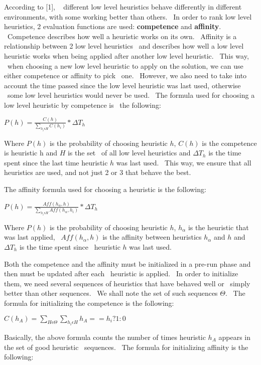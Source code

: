  According to [1], \ %
different low level heuristics behave differently in different environments, with some working better than others. \
In order to rank low level heuristics, 2 evaluation functions are used: \textbf{competence} and \textbf{affinity}. \
Competence describes how well a heuristic works on its own. \
Affinity is a relationship between 2 low level heuristics \
and describes how well a low level heuristic works when being applied after another low level heuristic. \
This way, \
when choosing a new low level heuristic to apply on the solution, we can use either competence or affinity to pick \
one. \
However, we also need to take into account the time passed since the low level heuristic was last used, otherwise \
some low level heuristics would never be used. \
The formula used for choosing a low level heuristic by competence is \
the following:

\( P(h) = \frac{C(h)}{\sum_{h_i \epsilon H} C(h_i)} * \Delta T_h \)

Where $P(h)$ is the probability of choosing heuristic $h$, $C(h)$ is the competence is heuristic h and $H$ is the set \
of all low level heuristics and $\Delta T_h$ is the time spent since the last time heuristic $h$ was last used. \
This way, we ensure that all heuristics are used, and not just 2 or 3 that behave the best.

The affinity formula used for choosing a heuristic is the following:

\( P(h) = \frac{Aff(h_\alpha, h)}{\sum_{h_i \epsilon H} Aff(h_\alpha , h_i)} * \Delta T_h \)

Where $P(h)$ is the probability of choosing heuristic $h$, $h_\alpha$ is the heuristic that was last applied, \
$Aff(h_\alpha , h)$ is the affinity between heuristics $h_\alpha$ and $h$ and $\Delta T_h$ is the time spent since \
heuristic $h$ was last used.

Both the competence and the affinity must be initialized in a pre-run phase and then must be updated after each \
heuristic is applied. \
In order to initialize them, we need several sequences of heuristics that have behaved well or \
simply better than other sequences. \
We shall note the set of such sequences $\Theta$. \
The formula for initializing the competence is the following:

\( C(h_A) = \sum_{H \epsilon \Theta} \sum_{h_i \epsilon H} h_A == h_i ? 1 : 0 \)

Basically, the above formula counts the number of times heuristic $h_A$ appears in the set of good heuristic \
sequences. \
The formula for initializing affinity is the following:

